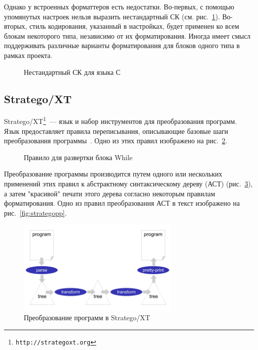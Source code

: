 Однако у встроенных форматтеров есть недостатки. Во-первых, с помощью упомянутых настроек нельзя выразить нестандартный СК (см. рис.~\ref{fig:unusualCC}). 
Во-вторых, стиль кодирования, указанный в настройках, будет применен ко всем блокам некоторого типа, независимо от их форматирования. 
Иногда имеет смысл поддерживать различные варианты форматирования для блоков одного типа в рамках проекта. %

\begin{figure}[h]
	\centering
	
	\caption{Нестандартный СК для языка С}
	\label{fig:unusualCC}
\end{figure}

\subsection{Stratego/XT}
Stratego/XT\footnote{\texttt{http://strategoxt.org}}~--- язык и набор инструментов для преобразования программ. Язык предоставляет правила переписывания, описывающие базовые шаги преобразования программы~\cite{stratego:xt}.
Одно из этих правил изображено на рис.~\ref{fig:rewriting}.

\begin{figure}[h]
	
	\caption{Правило для развертки блока While}
	\label{fig:rewriting}
\end{figure}

Преобразование программы производится путем одного или нескольких применений этих правил к абстрактному синтаксическому дереву (АСТ) (рис.~\ref{fig:stratego}), а затем "красивой" печати этого дерева согласно некоторым правилам форматирования. Одно из правил преобразования АСТ в текст изображено на рис.~\ref{fig:strategopp}.

\begin{figure}[h]
	\centering
	\includegraphics[width=0.7\textwidth]{Ozernykh/images/pipe.jpg}
	\caption[Преобразование программ в Stratego/XT]{Преобразование программ в Stratego/XT\footnotemark}
	\label{fig:stratego}
\end{figure}

